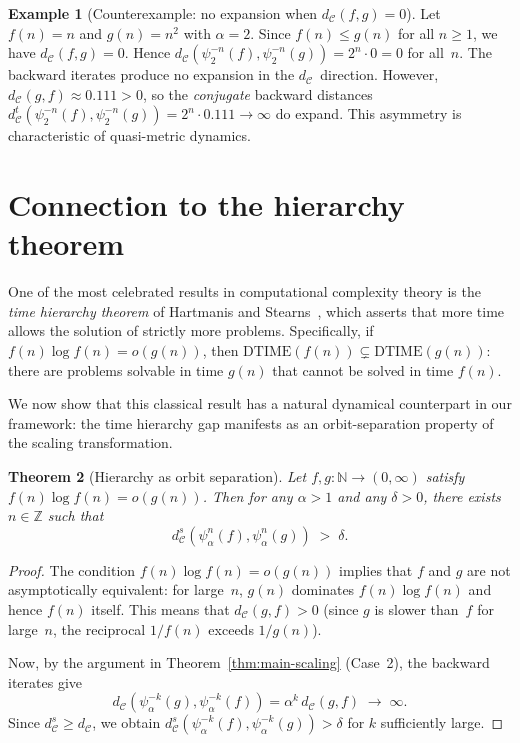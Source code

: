 \documentclass[11pt,a4paper]{article}
\theoremstyle{plain}
\newtheorem{theoreminner}{Theorem}[section]
\theoremstyle{definition}
\newtheorem{exampleinner}[theoreminner]{Example}
\newenvironment{theorem}[1][]{\begin{theoreminner}[#1]}{\end{theoreminner}}
\newenvironment{example}[1][]{\begin{exampleinner}[#1]}{\end{exampleinner}}
\newcommand{\N}{\mathbb{N}}
\newcommand{\Z}{\mathbb{Z}}
\newcommand{\C}{\mathcal{C}}
\begin{document}
\begin{example}[Counterexample: no expansion when $d_\C(f,g)=0$]
\label{ex:no-backward-exp}
Let $f(n)=n$ and $g(n)=n^2$ with $\alpha=2$.  Since $f(n)\le g(n)$
for all $n\ge 1$, we have $d_\C(f,g)=0$.  Hence
$d_\C(\psi_2^{-n}(f),\psi_2^{-n}(g))=2^n\cdot 0=0$ for all~$n$.
The backward iterates produce no expansion in the $d_\C$~direction.
However, $d_\C(g,f)\approx 0.111>0$, so the \emph{conjugate}
backward distances $d_\C^t(\psi_2^{-n}(f),\psi_2^{-n}(g))=2^n\cdot
0.111\to\infty$ do expand.  This asymmetry is characteristic of
quasi-metric dynamics.
\end{example}


\section{Connection to the hierarchy theorem}
\label{sec:hierarchy}

One of the most celebrated results in computational complexity
theory is the \emph{time hierarchy theorem} of Hartmanis and
Stearns~\cite{hartmanis1965}, which asserts that more time allows
the solution of strictly more problems.  Specifically, if
$f(n)\log f(n)=o(g(n))$, then
$\mathrm{DTIME}(f(n))\subsetneq\mathrm{DTIME}(g(n))$: there are
problems solvable in time $g(n)$ that cannot be solved in time
$f(n)$.

We now show that this classical result has a natural dynamical
counterpart in our framework: the time hierarchy gap manifests as
an orbit-separation property of the scaling transformation.

\begin{theorem}[Hierarchy as orbit separation]\label{thm:hierarchy}
Let $f,g\colon\N\to(0,\infty)$ satisfy $f(n)\log f(n)=o(g(n))$.
Then for any $\alpha>1$ and any $\delta>0$, there exists $n\in\Z$
such that
\[
  d_\C^s(\psi_\alpha^n(f),\psi_\alpha^n(g)) \;>\; \delta.
\]
\end{theorem}

\begin{proof}
The condition $f(n)\log f(n)=o(g(n))$ implies that $f$ and $g$ are
not asymptotically equivalent: for large~$n$, $g(n)$ dominates
$f(n)\log f(n)$ and hence $f(n)$ itself.  This means that
$d_\C(g,f)>0$ (since $g$ is slower than~$f$ for large~$n$, the
reciprocal $1/f(n)$ exceeds $1/g(n)$).

Now, by the argument in Theorem~\ref{thm:main-scaling} (Case~2),
the backward iterates give
\[
  d_\C(\psi_\alpha^{-k}(g),\psi_\alpha^{-k}(f))
  = \alpha^k\,d_\C(g,f) \;\to\;\infty.
\]
Since $d_\C^s\ge d_\C$, we obtain
$d_\C^s(\psi_\alpha^{-k}(f),\psi_\alpha^{-k}(g))>\delta$ for
$k$ sufficiently large.
\end{proof}
\end{document}
